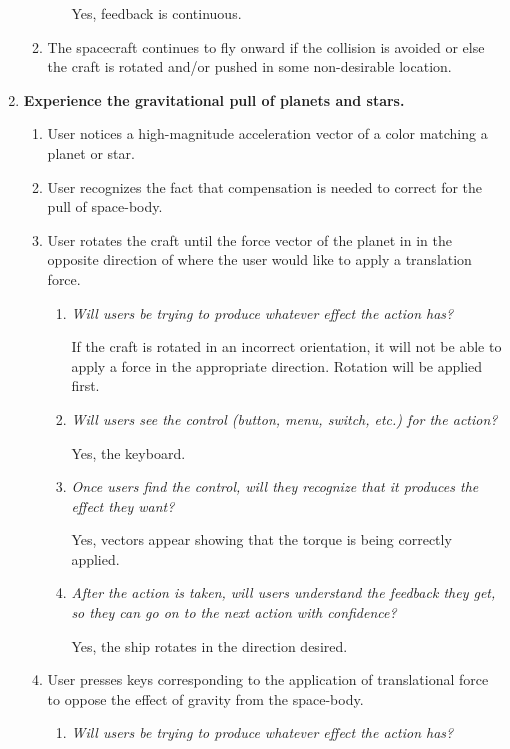 \begin{enumerate}
\begin{enumerate}
\begin{enumerate}
    Yes, feedback is continuous.
  \end{enumerate}

  \item The spacecraft continues to fly onward if the collision is avoided or else the craft is rotated and/or pushed in some non-desirable location.

\end{enumerate}

\item\textbf{Experience the gravitational pull of planets and stars.}
\begin{enumerate}

  \item User notices a high-magnitude acceleration vector of a color matching a planet or star.

  \item User recognizes the fact that compensation is needed to correct for the pull of space-body.

  \item User rotates the craft until the force vector of the planet in in the opposite direction of where the user would like to apply a translation force.
  \begin{enumerate}
    \item \emph{Will users be trying to produce whatever effect the action has?}

    If the craft is rotated in an incorrect orientation, it will not be able to apply a force in the appropriate direction.  Rotation will be applied first.
    \item \emph{Will users see the control (button, menu, switch, etc.) for the action?}

    Yes, the keyboard.
    \item \emph{Once users find the control, will they recognize that it produces the effect they want?}

    Yes, vectors appear showing that the torque is being correctly applied.
    \item \emph{After the action is taken, will users understand the feedback they get, so they can go on to the next action with confidence?}

    Yes, the ship rotates in the direction desired.
  \end{enumerate}

  \item User presses keys corresponding to the application of translational force to oppose the effect of gravity from the space-body.
  \begin{enumerate}
    \item \emph{Will users be trying to produce whatever effect the action has?}


\end{enumerate}
\end{enumerate}
\end{enumerate}
